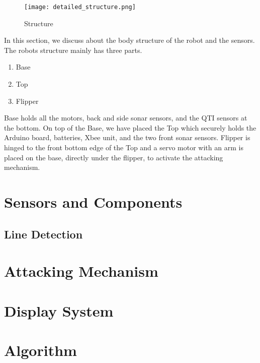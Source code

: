 \documentclass[11pt, letterpaper, oneside]{article}
\begin{document}
\begin{figure}[bth]
	\begin{center}
		\texttt{[image: detailed\_structure.png]}
		\caption{Structure}
		\label{fig:detailed_structure}
	\end{center}
\end{figure}

In this section, we discuss about the body structure of the robot and the sensors. The robots structure mainly has three parts. 
\begin{enumerate}
	\item Base
	\item Top
	\item Flipper
\end{enumerate}


Base holds all the motors, back and side sonar sensors, and the QTI sensors at the bottom. On top of the Base, we have placed the Top which securely holds the Arduino board, batteries, Xbee unit, and the two front sonar sensors. Flipper is hinged to the front bottom edge of the Top and a servo motor with an arm is placed on the base, directly under the flipper, to activate the attacking mechanism.

\newpage
\section{Sensors and Components}
\subsection{Line Detection}

\newpage
\section{Attacking Mechanism}

\newpage
\section{Display System}

\newpage
\section{Algorithm}
\end{document}
